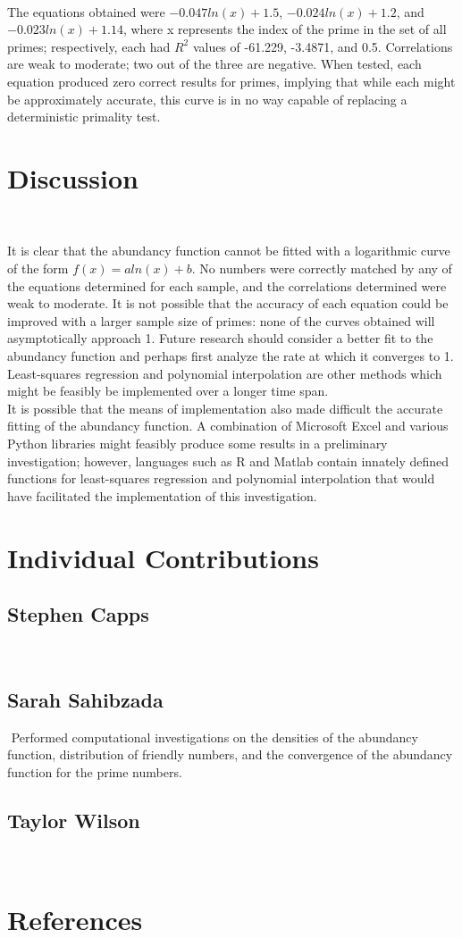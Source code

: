 \documentclass[11pt]{article}
\begin{document}
\\ The equations obtained were $-0.047ln(x) + 1.5$, $-0.024ln(x) + 1.2$, and $-0.023ln(x) + 1.14$, where x represents the index of the prime in the set of all primes; respectively, each had $R^{2}$ values of -61.229, -3.4871, and 0.5. Correlations are weak to moderate; two out of the three are negative. When tested, each equation produced zero correct results for primes, implying that while each might be approximately accurate, this curve is in no way capable of replacing a deterministic primality test.
\section{Discussion}$ $

It is clear that the abundancy function cannot be fitted with a logarithmic curve of the form $f(x) = aln(x) + b$. No numbers were correctly matched by any of the equations determined for each sample, and the correlations determined were weak to moderate. It is not possible that the accuracy of each equation could be improved with a larger sample size of primes: none of the curves obtained will asymptotically approach 1. Future research should consider a better fit to the abundancy function and perhaps first analyze the rate at which it converges to 1. Least-squares regression and polynomial interpolation are other methods which might be feasibly be implemented over a longer time span.
\\It is possible that the means of  implementation also made difficult the accurate fitting of the abundancy function. A combination of Microsoft Excel and various Python libraries might feasibly produce some results in a preliminary investigation; however, languages such as R and Matlab contain innately defined functions for least-squares regression and polynomial interpolation that would have facilitated the implementation of this investigation.



\indent  
\section{Individual Contributions}
\subsection{Stephen Capps}$ $
\indent   
\subsection{Sarah Sahibzada}$ $
\indent Performed computational investigations on the densities of the abundancy function, distribution of friendly numbers, and the convergence of the abundancy function for the prime numbers. 
\subsection{Taylor Wilson}$ $
\indent 

\newpage
\section{References}
\end{document}
